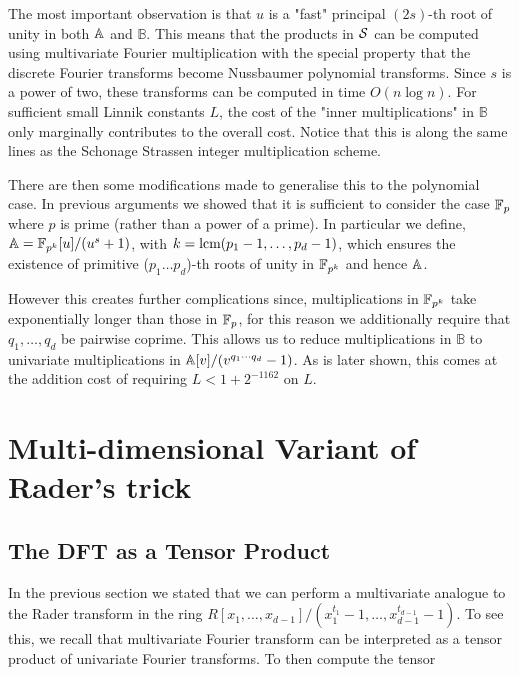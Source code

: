 The most important observation is that $u$ is a "fast" principal $(2s)$-th root of unity in both ${\mathbb A}$ and $\mathbb{B}$. This means that the products in $\mathcal S$ can be computed using multivariate Fourier multiplication with the special property that the discrete Fourier transforms become Nussbaumer polynomial transforms. Since $s$ is a power of two, these transforms can be computed in time $O(n \log n)$. For sufficient small Linnik constants $L$, the cost of the "inner multiplications" in $\mathbb{B}$ only marginally contributes to the overall cost. Notice that this is along the same lines as the Schonage Strassen integer multiplication scheme.

There are then some modifications made to generalise this to the polynomial case. In previous arguments we showed that it is sufficient to consider the case ${\mathbb F}_p$ where $p$ is prime (rather than a power of a prime). In particular we define, ${\mathbb A} = {\mathbb F}_{p^k}[u] / (u^s + 1)$, with $k = \textrm{lcm}(p_1 - 1, \ldots, p_d - 1)$, which ensures the existence of primitive ($p_1 \ldots p_d$)-th roots of unity in ${\mathbb F}_{p^k}$ and hence ${\mathbb A}$.

However this creates further complications since, multiplications in ${\mathbb F}_{p^k}$ take exponentially longer than those in ${\mathbb F}_p$, for this reason we additionally require that $q_1, \ldots, q_d$ be pairwise coprime. This allows us to reduce multiplications in $\mathbb{B}$ to univariate multiplications in ${\mathbb A}[v]/(v^{q_1\cdots q_d} - 1)$. As is later shown, this comes at the addition cost of requiring $L < 1 + 2^{-1162}$ on $L$.

\section{Multi-dimensional Variant of Rader's trick}%
\label{sec:multi_dimensional_variant_of_rader_s_trick}

\subsection{The DFT as a Tensor Product}%
\label{sub:the_dft_as_a_tensor_product}

In the previous section we stated that we can perform a multivariate analogue to the Rader transform in the ring $R[x_1, \ldots, x_{d-1}] / (x_1^{t_1} - 1, \ldots, x_{d-1}^{t_{d-1}} - 1)$. To see this, we recall that multivariate Fourier transform can be interpreted as a tensor product of univariate Fourier transforms. To then compute the tensor

